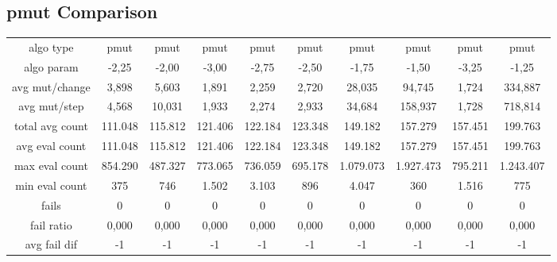 \subsection{pmut Comparison}
\begin{tabular}[h]{cccccccccc}
algo type&             pmut&      pmut&      pmut&      pmut&      pmut&      pmut&      pmut&      pmut&      pmut\\
algo param&           -2,25&     -2,00&     -3,00&     -2,75&     -2,50&     -1,75&     -1,50&     -3,25&     -1,25\\
avg mut/change&       3,898&     5,603&     1,891&     2,259&     2,720&    28,035&    94,745&     1,724&   334,887\\
avg mut/step&         4,568&    10,031&     1,933&     2,274&     2,933&    34,684&   158,937&     1,728&   718,814\\
\hline
total avg count&    111.048&   115.812&   121.406&   122.184&   123.348&   149.182&   157.279&   157.451&   199.763\\
avg eval count&     111.048&   115.812&   121.406&   122.184&   123.348&   149.182&   157.279&   157.451&   199.763\\
max eval count&     854.290&   487.327&   773.065&   736.059&   695.178& 1.079.073& 1.927.473&   795.211& 1.243.407\\
min eval count&         375&       746&     1.502&     3.103&       896&     4.047&       360&     1.516&       775\\
\hline
fails&                    0&         0&         0&         0&         0&         0&         0&         0&         0\\
fail ratio&           0,000&     0,000&     0,000&     0,000&     0,000&     0,000&     0,000&     0,000&     0,000\\
avg fail dif&            -1&        -1&        -1&        -1&        -1&        -1&        -1&        -1&        -1\\
\end{tabular}
